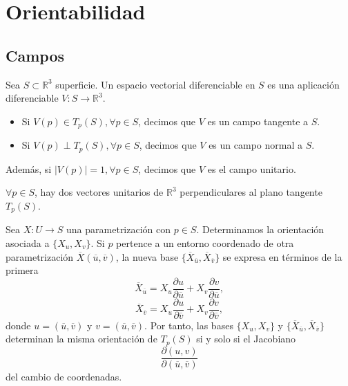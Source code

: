 \chapter{Orientabilidad}

\section{Campos}

\begin{defn}[Campo]
  Sea $S \subset \mathbb{R}^{3}$ superficie. Un espacio vectorial diferenciable en $S$ es una aplicación diferenciable $V : S \to \mathbb{R}^{3}$. 
  \begin{itemize}
    \item Si $V(p) \in T_{p}(S), \forall p \in S$, decimos que $V$ es un campo tangente a $S$.
    \item Si $V(p) \perp T_{p}(S), \forall p \in S$, decimos que $V$ es un campo normal a $S$. 
  \end{itemize}
  Además, si $| V(p) | = 1, \forall p \in S$, decimos que $V$ es el campo unitario.
\end{defn}

\begin{obs}
  $\forall p \in S$, hay dos vectores unitarios de $\mathbb{R}^{3}$ perpendiculares al plano tangente $T_{p}(S)$.
\end{obs}

\begin{note}
  Sea $X : U \to S$ una parametrización con $p \in S$. Determinamos la orientación asociada a $\{ X_{u}, X_{v} \}$. Si $p$ pertence a un entorno coordenado de otra parametrización $\overline{X}(\overline{u}, \overline{v})$, la nueva base $\{ \overline{X}_{\overline{u}}, \overline{X}_{\overline{v}} \}$ se expresa en términos de la primera
  \[ 
    \overline{X}_{\overline{u}} = X_{u} \frac{\partial{u}}{\partial{\overline{u}}} + X_{v} \frac{\partial{v}}{\partial{\overline{u}}},
  \] 
  \[ 
    \overline{X}_{\overline{v}} = X_{u} \frac{\partial{u}}{\partial{\overline{v}}} + X_{v} \frac{\partial{v}}{\partial{\overline{v}}},
  \] 
  donde $u = (\overline{u}, \overline{v})$ y $v = (\overline{u}, \overline{v})$. Por tanto, las bases $\{ X_{u}, X_{v} \}$ y $\{ \overline{X}_{\overline{u}}, \overline{X}_{\overline{v}} \}$ determinan la misma orientación de $T_{p}(S)$ si y solo si el Jacobiano
  \[ 
    \frac{\partial{(u, v)}}{\partial{(\overline{u}, \overline{v})}} 
  \] 
  del cambio de coordenadas.
\end{note}

